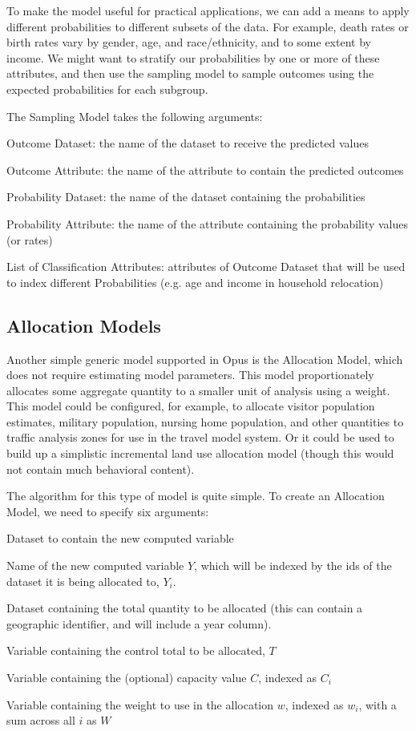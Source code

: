 To make the model useful for practical applications, we can add a means to apply different probabilities to different subsets of the data.  For example, death rates or birth rates vary by gender, age, and race/ethnicity, and to some extent by income.  We might want to stratify our probabilities by one or more of these attributes, and then use the sampling model to sample outcomes using the expected probabilities for each subgroup.

The Sampling Model takes the following arguments:

\squishlist
\item Outcome Dataset: the name of the dataset to receive the predicted values
\item Outcome Attribute: the name of the attribute to contain the predicted outcomes
\item Probability Dataset: the name of the dataset containing the probabilities
\item Probability Attribute: the name of the attribute containing the probability values (or rates)
\item List of Classification Attributes: attributes of Outcome Dataset that will be used to index different Probabilities (e.g. age and income in household relocation)
\squishend
\subsection{Allocation Models}
Another simple generic model supported in Opus is the Allocation Model, which does not require estimating model parameters.  This model proportionately allocates some aggregate quantity to a smaller unit of analysis using a weight.  This model could be configured, for example, to allocate visitor population estimates, military population, nursing home population, and other quantities to traffic analysis zones for use in the travel model system.  Or it could be used to build up a simplistic incremental land use allocation model (though this would not contain much behavioral content).

The algorithm for this type of model is quite simple.  To create an Allocation Model, we need to specify six arguments:

\squishlist
\item Dataset to contain the new computed variable
\item Name of the new computed variable $Y$, which will be indexed by the ids of the dataset it is being allocated to, $Y_i$.
\item Dataset containing the total quantity to be allocated (this can contain a geographic identifier, and will include a year column).
\item Variable containing the control total to be allocated, $T$
\item Variable containing the (optional) capacity value $C$, indexed as $C_i$
\item Variable containing the weight to use in the allocation $w$, indexed as $w_i$, with a sum across all $i$ as $W$
\squishend

